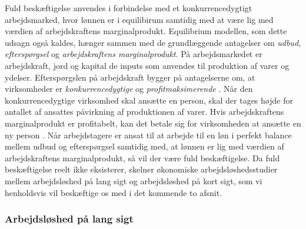 Fuld beskæftigelse anvendes i forbindelse med et konkurrencedygtigt arbejdsmarked, hvor lønnen er i equilibirum samtidig med at være lig med værdien af arbejdskraftens marginalprodukt. Equilibrium modellen, som dette udsagn også kaldes, hænger sammen med de grundlæggende antagelser om \textit{udbud}, \textit{efterspørgsel} og \textit{arbejdskraftens marginalprodukt}. På arbejdsmarkedet er arbejdskraft, jord og kapital de inputs som anvendes til produktion af varer og ydelser. Efterspørgslen på arbejdskraft bygger på antagelserne om, at virksomheder er \textit{konkurrencedygtige} og \textit{profitmaksimerende} \parencite[383]{Mankiw2011}. Når den konkurrencedygtige virksomhed skal ansætte en person, skal der tages højde for antallet af ansattes påvirkning af produktionen af varer. Hvis arbejdskraftens marginalprodukt er profitabelt, kan det betale sig for virksomheden at ansætte en ny person \parencite[384]{Mankiw2011}. Når arbejdstagere er ansat til at arbejde til en løn i perfekt balance mellem udbud og efterspørgsel samtidig med, at lønnen er lig med værdien af arbejdskraftens marginalprodukt, så vil der være fuld beskæftigelse. Da fuld beskæftigelse reelt ikke eksisterer, skelner økonomiske arbejdsløshedsstudier mellem arbejdsløshed på lang sigt og arbejdsløshed på kort sigt, som vi henholdsvis vil beskæftige os med i det kommende to afsnit. %


\subsubsection{Arbejdsløshed på lang sigt}

